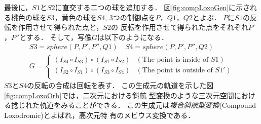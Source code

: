 最後に，$S1$と$S2$に直交する二つの球を追加する．
図\ref{fig:compLoxoGen}に示される桃色の球を$S3$，黄色の球を$S4$,
3つの制御点を$P，Q1，Q2$とよぶ．
$P$に$S1$の反転を作用させて得られた点と，$S2$の
反転を作用させて得られた点をそれぞれ$P'$，$P''$とする．
そして，写像$G$は以下のようになる．
\begin{align*}
S3 = sphere(P, P', P'', Q1) \quad
S4 = sphere(P, P', P'', Q2) \\
G =
\begin{cases}
 (I_{S4} \circ I_{S3}) \circ (I_{S1} \circ I_{S2}) & (\text{The point is inside of } S1) \\
 (I_{S2} \circ I_{S1}) \circ (I_{S3} \circ I_{S4}) & (\text{The point is
 outside of } S1')\\
\end{cases}
\end{align*}
$S3$と$S4$の反転の合成は回転を表す．
この生成元の軌道を示した図\ref{fig:compLoxoOrb}では，二次元における斜航
型変換のような三次元空間における捻じれた軌道をみることができる．
この生成元は\emph{複合斜航型変換}(Compound Loxodromic)とよばれ，高次元特
有のメビウス変換である．

